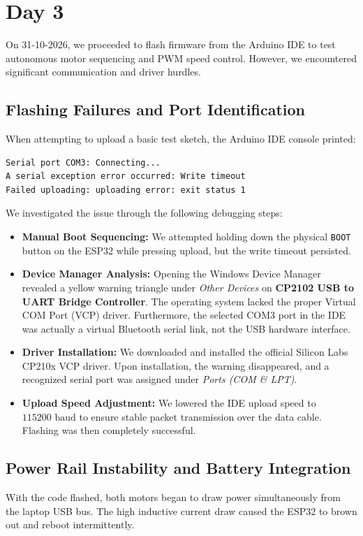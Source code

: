 \documentclass[11pt,a4paper]{article}
\begin{document}
\section{Day 3}
On 31-10-2026, we proceeded to flash firmware from the Arduino IDE to test autonomous motor sequencing and PWM speed control. However, we encountered significant communication and driver hurdles.

\subsection*{Flashing Failures and Port Identification}
When attempting to upload a basic test sketch, the Arduino IDE console printed:
\begin{verbatim}
Serial port COM3: Connecting...
A serial exception error occurred: Write timeout
Failed uploading: uploading error: exit status 1
\end{verbatim}

We investigated the issue through the following debugging steps:
\begin{itemize}
    \item \textbf{Manual Boot Sequencing:} We attempted holding down the physical \texttt{BOOT} button on the ESP32 while pressing upload, but the write timeout persisted.
    \item \textbf{Device Manager Analysis:} Opening the Windows Device Manager revealed a yellow warning triangle under \textit{Other Devices} on \textbf{CP2102 USB to UART Bridge Controller}. The operating system lacked the proper Virtual COM Port (VCP) driver. Furthermore, the selected COM3 port in the IDE was actually a virtual Bluetooth serial link, not the USB hardware interface.
    \item \textbf{Driver Installation:} We downloaded and installed the official Silicon Labs CP210x VCP driver. Upon installation, the warning disappeared, and a recognized serial port was assigned under \textit{Ports (COM \& LPT)}.
    \item \textbf{Upload Speed Adjustment:} We lowered the IDE upload speed to $115200\text{ baud}$ to ensure stable packet transmission over the data cable. Flashing was then completely successful.
\end{itemize}

\subsection*{Power Rail Instability and Battery Integration}
With the code flashed, both motors began to draw power simultaneously from the laptop USB bus. The high inductive current draw caused the ESP32 to brown out and reboot intermittently. 
\end{document}
